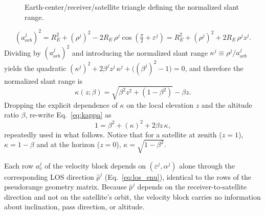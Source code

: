 \documentclass[letterpaper,times]{IONconf-v2}
\theoremstyle{plain}
\theoremstyle{remark}
\renewcommand{\vec}[1]{{\boldsymbol{\mathrm{#1}}}}
\begin{document}
\begin{figure}[htb]
{%
}\caption{Earth-center/receiver/satellite triangle defining the normalized slant range.}
\label{fig:slant_triangle}
\vspace{-20pt}
\end{figure}
%
\begin{equation}\label{eq:law_of_cosines}
(a_{orb}^j)^2 = R_E^2 + (\rho^j)^2 - 2 R_E\,\rho^j\cos\!\left(\tfrac{\pi}{2}+\varepsilon^j\right)
             = R_E^2 + (\rho^j)^2 + 2 R_E\,\rho^j z^j .
\end{equation}
%
Dividing by $(a_{orb}^j)^2$ and introducing the normalized slant range $\kappa^j \equiv \rho^j/a_{orb}^j$ yields the quadratic $(\kappa^j)^2 + 2\beta^j z^j\,\kappa^j + \big((\beta^j)^2 - 1\big) = 0$, and therefore the normalized slant range is
%
\begin{equation}\label{eq:kappa}
\kappa(z;\beta) = \sqrt{\beta^2 z^2 + (1 - \beta^2)} - \beta z .
\end{equation}
%
Dropping the explicit dependence of $\kappa$ on the local elevation $z$ and the altitude ratio $\beta$, re-write Eq.~\eqref{eq:kappa} as
%
\begin{equation}\label{eq:kappa_identity}
1 = \beta^2 + (\kappa)^2 + 2\beta z\,\kappa ,
\end{equation}
%
repeatedly used in what follows. Notice that for a satellite at zenith ($z=1$), $\kappa = 1-\beta$ and at the horizon ($z=0$), $\kappa = \sqrt{1-\beta^2}$.

Each row $a_v^j$ of the velocity block depends on $(\varepsilon^j, \alpha^j)$ alone through the corresponding LOS direction $\hat{\vec\rho}^j$ (Eq.~\eqref{eq:los_enu}), identical to the rows of the pseudorange geometry matrix. Because $\hat{\vec\rho}^j$ depends on the receiver-to-satellite direction and not on the satellite's orbit, the velocity block carries no information about inclination, pass direction, or altitude.
\end{document}
